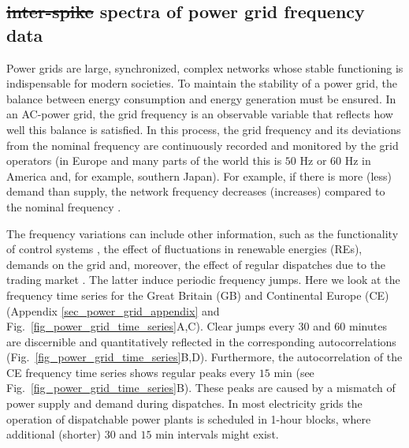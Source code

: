 \documentclass[entropy,article,submit,pdftex,moreauthors]{Definitions/mdpi}
\providecommand{\DIFadd}[1]{{\protect\color{blue}\uwave{#1}}} %
\providecommand{\DIFdel}[1]{{\protect\color{red}\sout{#1}}}                      %
\providecommand{\DIFaddbegin}{} %
\providecommand{\DIFaddend}{} %
\providecommand{\DIFdelbegin}{} %
\providecommand{\DIFdelend}{} %
\begin{document}
\subsection{\DIFdelbegin \DIFdel{inter-spike }\DIFdelend \DIFaddbegin \DIFadd{Inter-spike }\DIFaddend spectra of power grid frequency data}\label{sec_power_grid}

Power grids are large, synchronized, complex networks whose stable functioning is indispensable for modern societies.
To maintain the stability of a power grid, the balance between energy consumption and energy generation must be ensured. 
In an AC-power grid, the grid frequency is an observable variable that reflects how well this balance is satisfied. 
In this process, the grid frequency and its deviations from the nominal frequency are continuously recorded and monitored by 
the grid operators (in Europe and many parts of the world this is $50$ \si{Hz} or $60$ \si{Hz} in America and, for example, southern Japan).
For example, if there is more (less) demand than supply, the network frequency decreases (increases) compared to the nominal frequency \cite{kundur1994power}.
\DIFdelbegin %
\DIFdelend \DIFaddbegin 

\DIFaddend The frequency variations can include other information, such as the functionality of control systems \cite{gorjao2020data}, the effect of fluctuations in
renewable energies (REs), demands on the grid \cite{anvari2020stochastic} and, moreover, the effect of regular dispatches due to the trading market 
\cite{meyer2020identifying}. The latter induce periodic frequency jumps. Here we look at the frequency time series for the Great Britain (GB) and Continental Europe 
(CE) (Appendix \ref{sec_power_grid_appendix} and Fig.~\ref{fig_power_grid_time_series}A,C). Clear jumps every 30 and 60 minutes are discernible and quantitatively reflected in the corresponding 
autocorrelations (Fig.~\ref{fig_power_grid_time_series}B,D). Furthermore, the autocorrelation of the CE frequency time series shows regular peaks every $15$ \si{min} 
(see Fig.~\ref{fig_power_grid_time_series}B). These peaks are caused by a mismatch of power supply and demand \cite{weissbach2009high} during dispatches. 
In most electricity grids the operation of dispatchable power plants is scheduled in 1-hour blocks, where additional (shorter) $30$ and $15$ \si{min} intervals
might exist.
\DIFdelbegin %
\DIFdelend 
\end{document}
